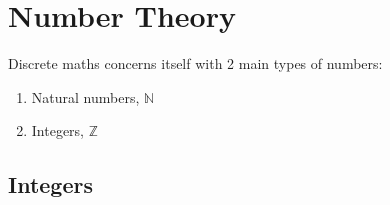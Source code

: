 \chapter{Number Theory}
\label{chap:NumberTheory}
Discrete maths concerns itself with 2 main types of numbers:
\begin{enumerate}
  \item Natural numbers, $\mathbb{N}$
  \item Integers, $\mathbb{Z}$
\end{enumerate}

\section{Integers}
